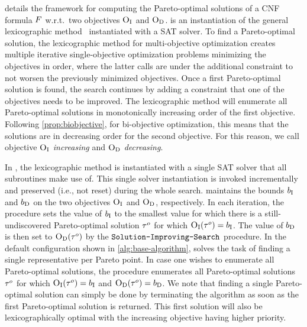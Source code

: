  details the \algname{} framework for computing the Pareto-optimal solutions of a CNF formula $F$ w.r.t.\ two objectives $\textsc{O}_{\text{I}}$ and $\textsc{O}_{\text{D}}$.
\algname{} is an instantiation of the general lexicographic method~\autocite{survey} instantiated with a SAT solver.
To find a Pareto-optimal solution, the lexicographic method for multi-objective optimization creates multiple iterative single-objective optimization problems minimizing the objectives in order, where the latter calls are under the additional constraint to not worsen the previously minimized objectives.
Once a first Pareto-optimal solution is found, the search continues by adding a constraint that one of the objectives needs to be improved.
The lexicographic method will enumerate all Pareto-optimal solutions in monotonically increasing order of the first objective.
Following \cref{prop:biobjective}, for bi-objective optimization, this means that the solutions are in decreasing order for the second objective.
For this reason, we call objective $\textsc{O}_{\text{I}}$ \emph{increasing} and $\textsc{O}_{\text{D}}$ \emph{decreasing}.

In \algname{}, the lexicographic method is instantiated with a single SAT solver that all subroutines make use of.
This single solver instantiation is invoked incrementally and preserved (i.e., not reset) during the whole search. 
\algname{} maintains the bounds $b_{\text{I}}$ and $b_{\text{D}}$ on the two objectives $\textsc{O}_{\text{I}}$ and $\textsc{O}_{\text{D}}$, respectively.
In each iteration, the \Min{} procedure sets the value of $b_{\text{I}}$ to the smallest value for which there is a still-undiscovered Pareto-optimal solution $\tau^o$ for which $\textsc{O}_{\text{I}}(\tau^o) = b_{\text{I}}$.
The value of $b_{\text{D}}$ is then set to $\textsc{O}_{\text{D}}(\tau^o)$ by the $\texttt{Solution-\allowbreak{}Improving-\allowbreak{}Search}$ procedure.
In the default configuration shown in \cref{alg:base-algorithm}, \algname{} solves the task of finding a single representative per Pareto point.
In case one wishes to enumerate all Pareto-optimal solutions, the \E{} procedure enumerates all Pareto-optimal solutions $\tau^o$ for which $\textsc{O}_{\text{I}}(\tau^o) = b_{\text{I}}$ and $\textsc{O}_{\text{D}}(\tau^o) = b_{\text{D}}$.
We note that finding a single Pareto-optimal solution can simply be done by terminating the algorithm as soon as the first Pareto-optimal solution is returned.
This first solution will also be lexicographically optimal with the increasing objective having higher priority.

